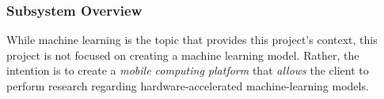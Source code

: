 
% 

\subsubsection{Subsystem Overview}
While machine learning is the topic that provides this project's context, this project is not focused on creating a machine learning model. Rather, the intention is to create a \textit{mobile computing platform} that \textit{allows} the client to perform research regarding hardware-accelerated machine-learning models.





